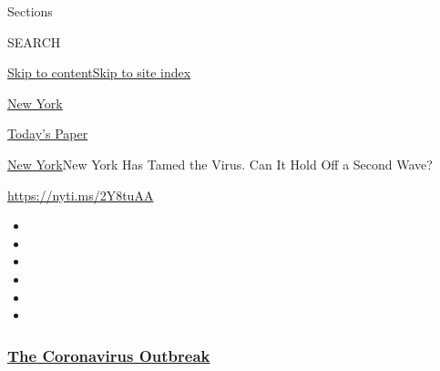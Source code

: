 Sections

SEARCH

\protect\hyperlink{site-content}{Skip to
content}\protect\hyperlink{site-index}{Skip to site index}

\href{https://www.nytimes3xbfgragh.onion/section/nyregion}{New York}

\href{https://myaccount.nytimes3xbfgragh.onion/auth/login?response_type=cookie\&client_id=vi}{}

\href{https://www.nytimes3xbfgragh.onion/section/todayspaper}{Today's
Paper}

\href{/section/nyregion}{New York}\textbar{}New York Has Tamed the
Virus. Can It Hold Off a Second Wave?

\url{https://nyti.ms/2Y8tuAA}

\begin{itemize}
\item
\item
\item
\item
\item
\item
\end{itemize}

\hypertarget{the-coronavirus-outbreak}{%
\subsubsection{\texorpdfstring{\href{https://www.nytimes3xbfgragh.onion/news-event/coronavirus?name=styln-coronavirus-national\&region=TOP_BANNER\&variant=undefined\&block=storyline_menu_recirc\&action=click\&pgtype=Article\&impression_id=01883f40-e395-11ea-a793-353d552722af}{The
Coronavirus
Outbreak}}{The Coronavirus Outbreak}}\label{the-coronavirus-outbreak}}

